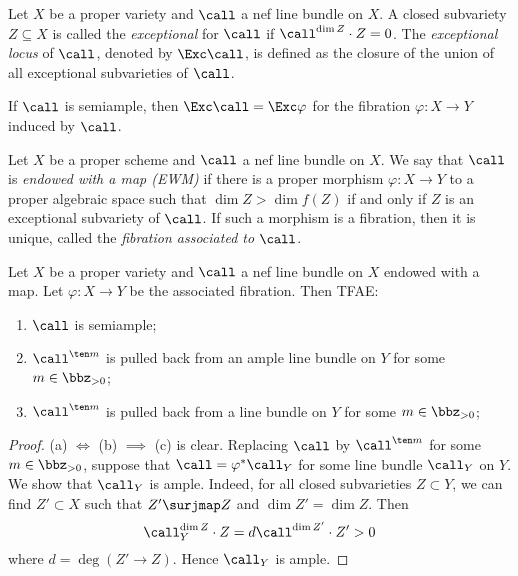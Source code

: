     \begin{definition}\label{def:exceptional_locus_of_nef_line_bundle}
        Let \(X\) be a proper variety and \(\call\) a nef line bundle on \(X\).
        A closed subvariety \(Z \subseteq X\) is called the \emph{exceptional} for \(\call\) if \(\call^{\dim Z} \cdot Z = 0\).
        The \emph{exceptional locus} of \(\call\), denoted by \(\Exc \call\), is defined as the closure of the union of all exceptional subvarieties of \(\call\).
    \end{definition}

    If \(\call\) is semiample, then \(\Exc \call = \Exc \varphi\) for the fibration \(\varphi: X \to Y\) induced by \(\call\).

    \begin{definition}\label{def:EWM_bpf_semiample}
        Let \(X\) be a proper scheme and \(\call\) a nef line bundle on \(X\).
        We say that \(\call\) is \emph{endowed with a map (EWM)} if there is a proper morphism \(\varphi: X \to Y\) to a proper algebraic space such that \(\dim Z > \dim f(Z)\) if and only if \(Z\) is an exceptional subvariety of \(\call\).
        If such a morphism is a fibration, then it is unique, called the \emph{fibration associated to \(\call\)}.
    \end{definition}

    \begin{proposition}\label{lem:fundamental_properties_of_EWM}
        Let \(X\) be a proper variety and \(\call\) a nef line bundle on \(X\) endowed with a map.
        Let \(\varphi: X \to Y\) be the associated fibration.
        Then TFAE:
        \begin{enumerate}
            \item \(\call\) is semiample;
            \item \(\call^{\ten m}\) is pulled back from an ample line bundle on \(Y\) for some \(m \in \bbz_{>0}\);
            \item \(\call^{\ten m}\) is pulled back from a line bundle on \(Y\) for some \(m \in \bbz_{>0}\);
        \end{enumerate}
    \end{proposition}
    \begin{proof}
        (a) \(\Leftrightarrow \) (b) \(\implies\) (c) is clear.
        Replacing \(\call\) by \(\call^{\ten m}\) for some \(m \in \bbz_{>0}\), suppose that \(\call = \varphi^*\call_Y\) for some line bundle \(\call_Y\) on \(Y\).
        We show that \(\call_Y\) is ample.
        Indeed, for all closed subvarieties \(Z \subset Y\), we can find \(Z' \subset X\) such that \(Z' \surjmap Z\) and \(\dim Z' = \dim Z\).
        Then 
        \[ \call_Y^{\dim Z} \cdot Z = d \call^{\dim Z'} \cdot Z' > 0 \]
        where \(d = \deg(Z' \to Z)\).
        Hence \(\call_Y\) is ample.
    \end{proof}

